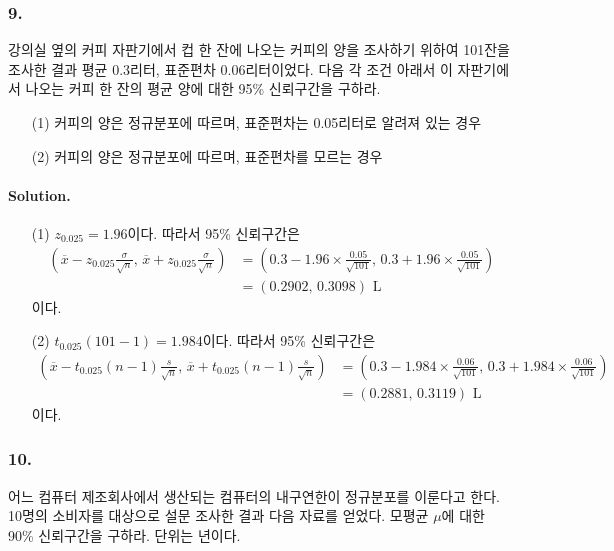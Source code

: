 \subsubsection{9.} 강의실 옆의 커피 자판기에서 컵 한 잔에 나오는 커피의 양을 조사하기 위하여 101잔을 조사한 결과 평균 0.3리터, 표준편차 0.06리터이었다.
다음 각 조건 아래서 이 자판기에서 나오는 커피 한 잔의 평균 양에 대한 95\% 신뢰구간을 구하라.

\begin{itemize}
    \item[(1)] 커피의 양은 정규분포에 따르며, 표준편차는 0.05리터로 알려져 있는 경우
    \item[(2)] 커피의 양은 정규분포에 따르며, 표준편차를 모르는 경우 
\end{itemize}

\paragraph{Solution.}
\begin{itemize}
    \item[(1)] {
        $z_{0.025}=1.96$이다. 따라서 95\% 신뢰구간은
        \begin{align*}
            \left(\overline{x}-z_{0.025}\frac{\sigma}{\sqrt{n}},\,\overline{x}+z_{0.025}\frac{\sigma}{\sqrt{n}}\right)
            &= \left(0.3-1.96\times\frac{0.05}{\sqrt{101}},\,0.3+1.96\times\frac{0.05}{\sqrt{101}}\right) \\
            &= \left(0.2902,\,0.3098\right)\mbox{ L}
        \end{align*}
        이다.
    }
    \item[(2)] {
        $t_{0.025}\left(101-1\right)=1.984$이다. 따라서 95\% 신뢰구간은
        \begin{align*}
            \left(\overline{x}-t_{0.025}\left(n-1\right)\frac{s}{\sqrt{n}},\,\overline{x}+t_{0.025}\left(n-1\right)\frac{s}{\sqrt{n}}\right)
            &= \left(0.3-1.984\times\frac{0.06}{\sqrt{101}},\,0.3+1.984\times\frac{0.06}{\sqrt{101}}\right) \\
            &= \left(0.2881,\,0.3119\right)\mbox{ L}
        \end{align*}
        이다.
    }
\end{itemize}

\subsubsection{10.} 어느 컴퓨터 제조회사에서 생산되는 컴퓨터의 내구연한이 정규분포를 이룬다고 한다. 10명의 소비자를 대상으로 설문 조사한 결과 다음 자료를 얻었다.
모평균 $\mu$에 대한 90\% 신뢰구간을 구하라. 단위는 년이다.

